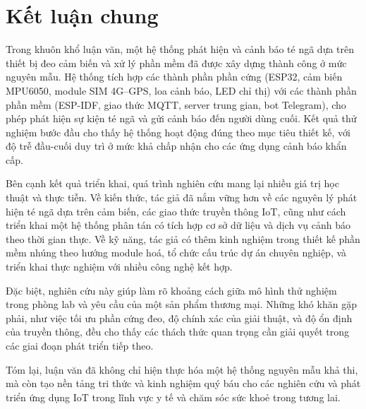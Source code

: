 
\section{Kết luận chung}
\label{sec:overall_conclusion}

Trong khuôn khổ luận văn, một hệ thống phát hiện và cảnh báo té ngã dựa trên thiết bị đeo cảm biến và xử lý phần mềm đã được xây dựng thành công ở mức nguyên mẫu. Hệ thống tích hợp các thành phần phần cứng (ESP32, cảm biến MPU6050, module SIM 4G--GPS, loa cảnh báo, LED chỉ thị) với các thành phần phần mềm (ESP-IDF, giao thức MQTT, server trung gian, bot Telegram), cho phép phát hiện sự kiện té ngã và gửi cảnh báo đến người dùng cuối. Kết quả thử nghiệm bước đầu cho thấy hệ thống hoạt động đúng theo mục tiêu thiết kế, với độ trễ đầu-cuối duy trì ở mức khả chấp nhận cho các ứng dụng cảnh báo khẩn cấp.  

Bên cạnh kết quả triển khai, quá trình nghiên cứu mang lại nhiều giá trị học thuật và thực tiễn. Về kiến thức, tác giả đã nắm vững hơn về các nguyên lý phát hiện té ngã dựa trên cảm biến, các giao thức truyền thông IoT, cũng như cách triển khai một hệ thống phân tán có tích hợp cơ sở dữ liệu và dịch vụ cảnh báo theo thời gian thực. Về kỹ năng, tác giả có thêm kinh nghiệm trong thiết kế phần mềm nhúng theo hướng module hoá, tổ chức cấu trúc dự án chuyên nghiệp, và triển khai thực nghiệm với nhiều công nghệ kết hợp.  

Đặc biệt, nghiên cứu này giúp làm rõ khoảng cách giữa mô hình thử nghiệm trong phòng lab và yêu cầu của một sản phẩm thương mại. Những khó khăn gặp phải, như việc tối ưu phần cứng đeo, độ chính xác của giải thuật, và độ ổn định của truyền thông, đều cho thấy các thách thức quan trọng cần giải quyết trong các giai đoạn phát triển tiếp theo.  

Tóm lại, luận văn đã không chỉ hiện thực hóa một hệ thống nguyên mẫu khả thi, mà còn tạo nền tảng tri thức và kinh nghiệm quý báu cho các nghiên cứu và phát triển ứng dụng IoT trong lĩnh vực y tế và chăm sóc sức khoẻ trong tương lai.
